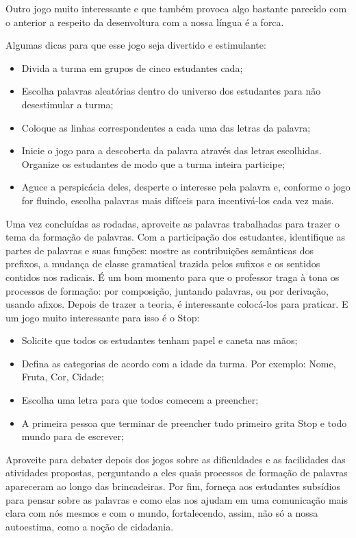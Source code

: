 \documentclass[11pt]{extarticle}
\begin{document}
Outro jogo muito interessante e que também provoca algo bastante parecido com o anterior a respeito da desenvoltura com a nossa língua é a forca. 

Algumas dicas para que esse jogo seja divertido e estimulante: 


\begin{itemize}
\item Divida a turma em grupos de cinco estudantes cada;
\item Escolha palavras aleatórias dentro do universo dos estudantes para não desestimular a turma;
\item Coloque as linhas correspondentes a cada uma das letras da palavra; 
\item Inicie o jogo para a descoberta da palavra através das letras escolhidas. Organize os estudantes de modo que a turma inteira participe;
\item Aguce a perspicácia deles, desperte o interesse pela palavra e, conforme o jogo for fluindo, escolha palavras mais difíceis para incentivá-los cada vez mais.

\end{itemize}

Uma vez concluídas as rodadas, aproveite as palavras trabalhadas para trazer o tema da formação de palavras. Com a participação dos estudantes, identifique as partes de palavras e suas funções: mostre as contribuições semânticas dos prefixos, a mudança de classe gramatical trazida pelos sufixos e os sentidos contidos nos radicais. É um bom momento para que o professor traga à tona os processos de formação: por composição, juntando palavras, ou por derivação, usando afixos. Depois de trazer a teoria, é interessante colocá-los para praticar. E um jogo muito interessante para isso é o Stop:

\begin{itemize}
\item Solicite que todos os estudantes tenham papel e caneta nas mãos;
\item Defina as categorias de acordo com a idade da turma. Por exemplo: Nome, Fruta, Cor, Cidade;
\item Escolha uma letra para que todos comecem a preencher;
\item A primeira pessoa que terminar de preencher tudo primeiro grita Stop e todo mundo para de escrever;
\end{itemize}

Aproveite para debater depois dos jogos sobre as dificuldades e as facilidades das atividades propostas, perguntando a eles quais processos de formação de palavras apareceram ao longo das brincadeiras. Por fim, forneça aos estudantes subsídios para pensar sobre as palavras e como elas nos ajudam em uma comunicação mais clara com nós mesmos e com o mundo, fortalecendo, assim, não só a nossa autoestima, como a noção de cidadania.
\end{document}

